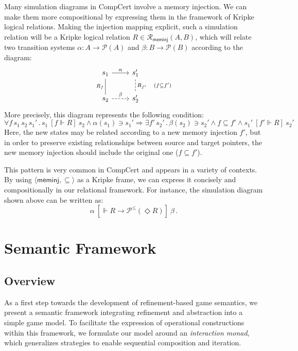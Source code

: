 \documentclass[acmsmall,timestamp,review,anonymous]{acmart}
\newcommand{\kw}[1]{\ensuremath{ \mathsf{#1} }}
\newcommand{\ifr}[1]{\ [{#1}]\ }
\begin{document}
\begin{example} \label{ex:sim} %
Many simulation diagrams in CompCert
involve a memory injection.
We can make them more compositional by
expressing them in the framework of Kripke logical relations.
Making the injection mapping explicit,
such a simulation relation will be a Kripke logical relation
$R \in \mathcal{R}_\kw{meminj}(A, B)$,
which will relate two transition systems
$\alpha : A \rightarrow \mathcal{P}(A)$ and
$\beta : B \rightarrow \mathcal{P}(B)$
according to the diagram:
\[
  \begin{tikzcd}
    s_1 \arrow[r, "\alpha"]
        \arrow[d, dash, "R_f"'] &
    s_1' \arrow[d, dashed, dash, "R_{f'} \quad (f \subseteq f')"] \\
    s_2 \arrow[r, dashed, "\beta"] &
    s_2'
  \end{tikzcd}
\]
More precisely, this diagram represents the following condition:
\[
    \forall f \, s_1 \, s_2 \, s_1' \,.\,
      s_1 \ifr{f \Vdash R} s_2 \wedge
      \alpha(s_1) \ni s_1' \Rightarrow
    \exists f' \, s_2' \,.\,
      \beta(s_2) \ni s_2' \wedge
      f \subseteq f' \wedge
      s_1' \ifr{f' \Vdash R} s_2'
\]
Here, the new states may be related according to
a new memory injection $f'$,
but in order to preserve existing relationships
between source and target pointers,
the new memory injection should include
the original one ($f \subseteq f'$).

This pattern is very common in CompCert
and appears in a variety of contexts.
By using $\langle \kw{meminj}, {\subseteq} \rangle$
as a Kripke frame,
we can express it concisely and compositionally
in our relational framework.
For instance,
the simulation diagram shown above can be written as:
\[
  \alpha \ifr{\Vdash R \rightarrow \mathcal{P}^\le(\Diamond R)} \beta \,.
\]
\end{example}



\section{Semantic Framework} \label{sec:monad} %

\subsection{Overview} %

As a first step towards
the development of refinement-based game semantics,
we present a semantic framework
integrating refinement and abstraction
into a simple game model.
To facilitate the expression of operational constructions
within this framework,
we formulate our model around an \emph{interaction monad},
which generalizes strategies to enable
sequential composition and iteration.
\end{document}

